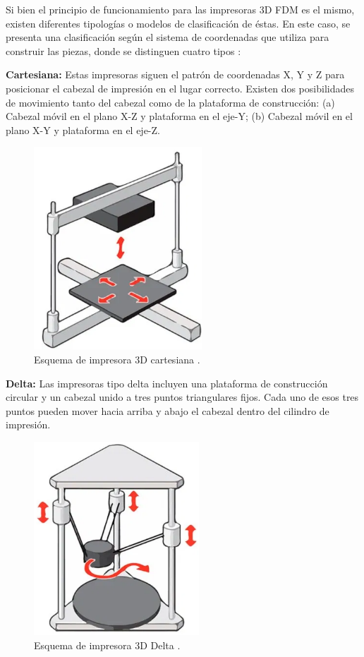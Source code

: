 Si bien el principio de funcionamiento para las impresoras 3D FDM es el mismo, existen diferentes tipologías o modelos de clasificación de éstas. En este caso, se presenta una clasificación según el sistema de coordenadas que utiliza para construir las piezas, donde se distinguen cuatro tipos \parencite{b3dsourced2020}:

\begin{description}
\item \textbf{Cartesiana:} Estas impresoras siguen el patrón de coordenadas X, Y y Z para posicionar el cabezal de impresión en el lugar correcto. Existen dos posibilidades de movimiento tanto del cabezal como de la plataforma de construcción: (a) Cabezal móvil en el plano X-Z y plataforma en el eje-Y; (b) Cabezal móvil en el plano X-Y y plataforma en el eje-Z.

\begin{figure}[H]
\centering
\includegraphics[scale=0.6]{images/cartesiana.png}
\caption{Esquema de impresora 3D cartesiana \parencite{b3dsourced2020}.}
\end{figure}

\item \textbf{Delta:} Las impresoras tipo delta incluyen una plataforma de construcción circular y un cabezal unido a tres puntos triangulares fijos. Cada uno de esos tres puntos pueden mover hacia arriba y abajo el cabezal dentro del cilindro de impresión.

\begin{figure}[H]
\centering
\includegraphics[scale=0.6]{images/delta.png}
\caption{Esquema de impresora 3D Delta \parencite{b3dsourced2020}.}
\end{figure}


\end{description}
